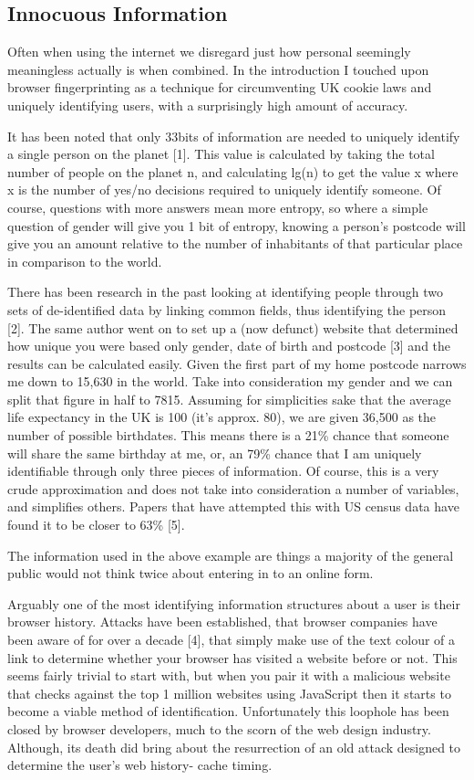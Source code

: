 \subsection{Innocuous Information}
Often when using the internet we disregard just how personal seemingly meaningless actually is when combined. In the introduction I touched upon browser fingerprinting as a technique for circumventing UK cookie laws and uniquely identifying users, with a surprisingly high amount of accuracy. 

It has been noted that only 33bits of information are needed to uniquely identify a single person on the planet [1]. This value is calculated by taking the total number of people on the planet n, and calculating lg(n) to get the value x where x is the number of yes/no decisions required to uniquely identify someone. Of course, questions with more answers mean more entropy, so where a simple question of gender will give you 1 bit of entropy, knowing a person’s postcode will  give you an amount relative to the number of inhabitants of that particular place in comparison to the world.

There has been research in the past looking at identifying people through two sets of de-identified data by linking common fields, thus identifying the person [2]. The same author went on to set up a (now defunct) website that determined how unique you were based only gender, date of birth and postcode [3] and the results can be calculated easily. Given the first part of my home postcode narrows me down to 15,630 in the world. Take into consideration my gender and we can split that figure in half to 7815. Assuming for simplicities sake that the average life expectancy in the UK is 100 (it’s approx. 80), we are given 36,500 as the number of possible birthdates. This means there is a 21\% chance that someone will share the same birthday at me, or, an 79\% chance that I am uniquely identifiable through only three pieces of information. Of course, this is a very crude approximation and does not take into consideration a number of variables, and simplifies others. Papers that have attempted this with US census data have found it to be closer to 63\% [5].

The information used in the above example are things a majority of the general public would not think twice about entering in to an online form.

Arguably one of the most identifying information structures about a user is their browser history. Attacks have been established, that browser companies have been aware of for over a decade [4], that simply make use of the text colour of a link to determine whether your browser has visited a website before or not. This seems fairly trivial to start with, but when you pair it with a malicious website that checks against the top 1 million websites using JavaScript then it starts to become a viable method of identification. Unfortunately this loophole has been closed by browser developers, much to the scorn of the web design industry. Although, its death did bring about the resurrection of an old attack designed to determine the user's web history- cache timing. 

